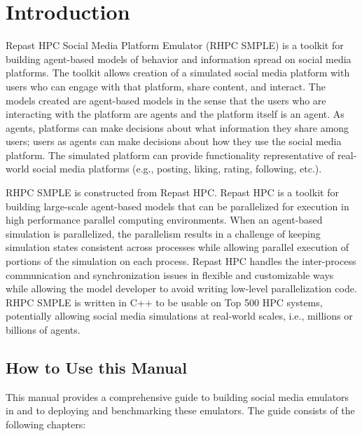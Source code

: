 
\chapter[Introduction]{Introduction} \label{chap:Introduction}

Repast HPC Social Media Platform Emulator (RHPC SMPLE) is a toolkit for building agent-based models of behavior and information spread on social media platforms. The toolkit allows creation of a simulated social media platform with users who can engage with that platform, share content, and interact. The models created are agent-based models in the sense that the users who are interacting with the platform are agents and the platform itself is an agent. As agents, platforms can make decisions about what information they share among users; users as agents can make decisions about how they use the social media platform. The simulated platform can provide functionality representative of real-world social media platforms (e.g., posting, liking, rating, following, etc.). 

RHPC SMPLE is constructed from Repast HPC. Repast HPC is a toolkit for building large-scale agent-based models that can be parallelized for execution in high performance parallel computing environments. When an agent-based simulation is parallelized, the parallelism results in a challenge of keeping simulation states consistent across processes while allowing parallel execution of portions of the simulation on each process. Repast HPC handles the inter-process communication and synchronization issues in flexible and customizable ways while allowing the model developer to avoid writing low-level parallelization code. RHPC SMPLE is written in C++ to be usable on Top 500 HPC systems, potentially allowing social media simulations at real-world scales, i.e., millions or billions of agents.

\section{How to Use this Manual}

This manual provides a comprehensive guide to building social media emulators in \rhpc and to deploying and benchmarking these emulators. The guide consists of the following chapters:


